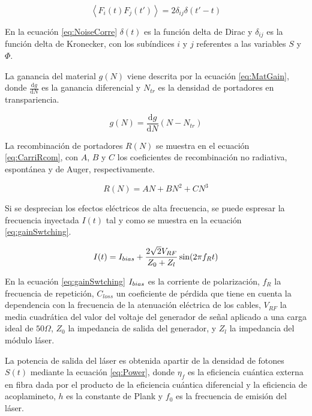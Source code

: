 	\begin{equation}
		\left \langle F_i(t)F_j(t') \right \rangle = 2\delta_{ij}\delta(t'-t)
		\label{eq:NoiseCorre}
	\end{equation}

En la ecuación \ref{eq:NoiseCorre} $\delta(t)$ es la función delta de Dirac y $\delta_{ij}$ es la función delta de Kronecker, con los subíndices $i$ y $j$ referentes a las variables $S$ y $\Phi$.

La ganancia del material $g(N)$ viene descrita por la ecuación \ref{eq:MatGain}, donde $\frac{\mathrm{d}g}{\mathrm{d}N}$ es la ganancia diferencial y $N_{tr}$ es la densidad de portadores en transpariencia.

	\begin{equation}
		g(N) = \frac{\mathrm{d}g}{\mathrm{d}N} (N - N_{tr})
		\label{eq:MatGain}
	\end{equation}

La recombinación de portadores $R(N)$ se muestra en el ecuación \ref{eq:CarriRcom}, con $A$, $B$ y $C$ los coeficientes de recombinación no radiativa, espontánea y de Auger, respectivamente.

	\begin{equation}
		R(N) = AN + BN^2 + CN^3
		\label{eq:CarriRcom}
	\end{equation}

Si se desprecian los efectos el\'ectricos de alta frecuencia, se puede espresar la frecuencia inyectada $I(t)$ tal y como se muestra en la ecuación \ref{eq:gainSwtching}.

	\begin{equation}
		I(t) = I_{bias} + \frac{2\sqrt{2}V_{RF}}{Z_0+Z_l} \sin(2\pi f_R t)
		\label{eq:gainSwtching}
	\end{equation}

	En la ecuación \ref{eq:gainSwtching} $I_{bias}$ es la corriente de polarización, $f_R$ la frecuencia de repetici\'on, $C_{loss}$ un coeficiente de p\'erdida que tiene en cuenta la dependencia con la frecuencia de la atenuaci\'on el\'ectrica de los cables, $V_{RF}$ la media cuadr\'atica del valor del voltaje del generador de señal aplicado a una carga ideal de $50 \Omega$, $Z_0$ la impedancia de salida del generador, y $Z_l$ la impedancia del m\'odulo l\'aser.

	La potencia de salida del l\'aser es obtenida apartir de la densidad de fotones $S(t)$ mediante la ecuaci\'on \ref{eq:Power}, donde $\eta_f$ es la eficiencia cu\'antica externa en fibra dada por el producto de la eficiencia cu\'antica diferencial y la eficiencia de acoplamineto, $h$ es la constante de Plank y $f_0$ es la frecuencia de emisión del l\'aser.

